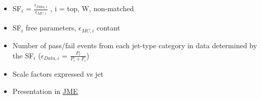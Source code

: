 {\begin{columns}[T]
\begin{column}{0.5\textwidth}
        \begin{itemize}
          \small
        \item SF$_{i}$ = $\frac{\epsilon_{Data,i}}{\epsilon_{MC,i}}$ ,
          i = top, W, non-matched
        \item SF$_{i}$ free parameters, $\epsilon_{MC,i}$ contant
        \item Number of pass/fail events from each jet-type category in data determined by the SF$_{i}$ ($\epsilon_{Data,i}$ = $\frac{P_{i}}{P_{i}+F_{i}}$)
          \vspace{0.3cm}
        \item Scale factors expressed vs jet \pT
        \item Presentation in \href{https://indico.cern.ch/event/1221195/contributions/5141581/attachments/2556595/4405807/Top_W_Calibration_Talk.pdf}{\textcolor{\MySectionColour}{JME}}
        \end{itemize}
      \end{column}
    \end{columns}
    
}


